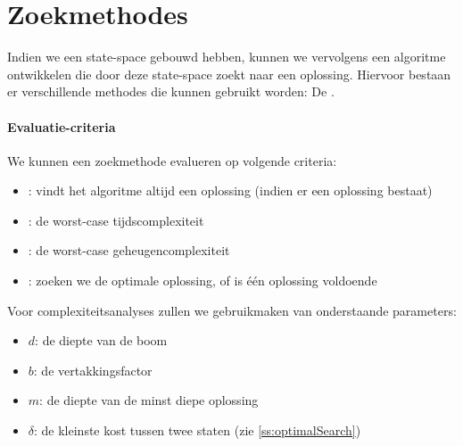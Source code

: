 \section{Zoekmethodes}
\label{s:searchMethods}
Indien we een state-space gebouwd hebben, kunnen we vervolgens een algoritme ontwikkelen die door deze state-space zoekt naar een oplossing. Hiervoor bestaan er verschillende methodes die kunnen gebruikt worden: De .
\paragraph{Evaluatie-criteria}
We kunnen een zoekmethode evalueren op volgende criteria:
\begin{itemize}
 \item {}: vindt het algoritme altijd een oplossing (indien er een oplossing bestaat)
 \item {}: de worst-case tijdscomplexiteit
 \item {}: de worst-case geheugencomplexiteit
 \item {}: zoeken we de optimale oplossing, of is één oplossing voldoende
\end{itemize}
Voor complexiteitsanalyses zullen we gebruikmaken van onderstaande parameters:
\begin{itemize}
 \item $d$: de diepte van de boom
 \item $b$: de vertakkingsfactor
 \item $m$: de diepte van de minst diepe oplossing
 \item $\delta$: de kleinste kost tussen twee staten (zie \ref{ss:optimalSearch})
\end{itemize}
